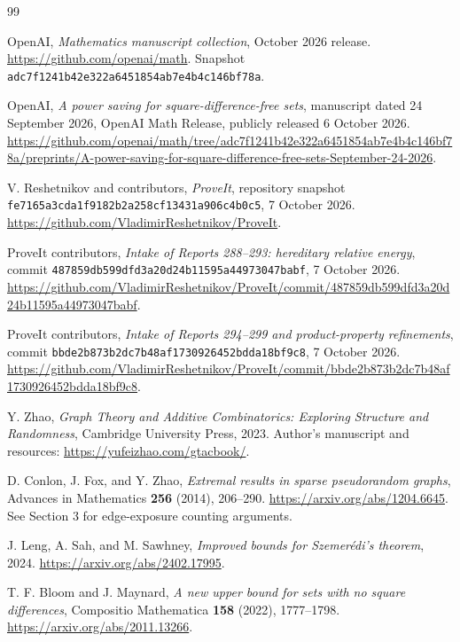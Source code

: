\documentclass[11pt,a4paper]{article}
\numberwithin{equation}{section}
\theoremstyle{definition}
\theoremstyle{remark}
\newcommand{\sourcecommit}{\texttt{adc7f1241b42e322a6451854ab7e4b4c146bf78a}}
\begin{document}
\begin{thebibliography}{99}
\raggedright\small
{}
OpenAI, \emph{Mathematics manuscript collection}, October 2026 release.
\url{https://github.com/openai/math}. Snapshot \sourcecommit.

OpenAI, \emph{A power saving for square-difference-free sets},
manuscript dated 24 September 2026, OpenAI Math Release, publicly
released 6 October 2026.
\url{https://github.com/openai/math/tree/adc7f1241b42e322a6451854ab7e4b4c146bf78a/preprints/A-power-saving-for-square-difference-free-sets-September-24-2026}.

V. Reshetnikov and contributors, \emph{ProveIt}, repository snapshot
\texttt{fe7165a3cda1f9182b2a258cf13431a906c4b0c5}, 7 October 2026.
\url{https://github.com/VladimirReshetnikov/ProveIt}.

ProveIt contributors, \emph{Intake of Reports 288--293: hereditary
relative energy}, commit \texttt{487859db599dfd3a20d24b11595a44973047babf},
7 October 2026.
\url{https://github.com/VladimirReshetnikov/ProveIt/commit/487859db599dfd3a20d24b11595a44973047babf}.

ProveIt contributors, \emph{Intake of Reports 294--299 and product-property
refinements}, commit \texttt{bbde2b873b2dc7b48af1730926452bdda18bf9c8},
7 October 2026.
\url{https://github.com/VladimirReshetnikov/ProveIt/commit/bbde2b873b2dc7b48af1730926452bdda18bf9c8}.

Y. Zhao, \emph{Graph Theory and Additive Combinatorics: Exploring
Structure and Randomness}, Cambridge University Press, 2023.
Author's manuscript and resources: \url{https://yufeizhao.com/gtacbook/}.

D. Conlon, J. Fox, and Y. Zhao, \emph{Extremal results in sparse
pseudorandom graphs}, Advances in Mathematics \textbf{256} (2014),
206--290. \url{https://arxiv.org/abs/1204.6645}. See Section 3 for
edge-exposure counting arguments.

J. Leng, A. Sah, and M. Sawhney, \emph{Improved bounds for Szemer\'edi's
theorem}, 2024. \url{https://arxiv.org/abs/2402.17995}.

T. F. Bloom and J. Maynard, \emph{A new upper bound for sets with no
square differences}, Compositio Mathematica \textbf{158} (2022),
1777--1798. \url{https://arxiv.org/abs/2011.13266}.
\end{thebibliography}
\end{document}
